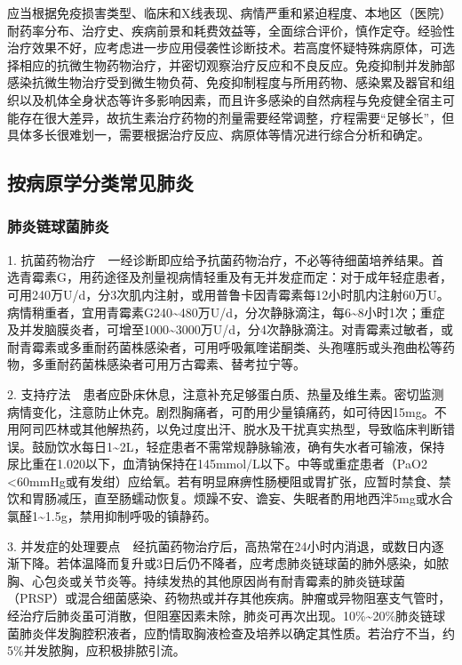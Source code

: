 应当根据免疫损害类型、临床和X线表现、病情严重和紧迫程度、本地区（医院）耐药率分布、治疗史、疾病前景和耗费效益等，全面综合评价，慎作定夺。经验性治疗效果不好，应考虑进一步应用侵袭性诊断技术。若高度怀疑特殊病原体，可选择相应的抗微生物药物治疗，并密切观察治疗反应和不良反应。免疫抑制并发肺部感染抗微生物治疗受到微生物负荷、免疫抑制程度与所用药物、感染累及器官和组织以及机体全身状态等许多影响因素，而且许多感染的自然病程与免疫健全宿主可能存在很大差异，故抗生素治疗药物的剂量需要经常调整，疗程需要“足够长”，但具体多长很难划一，需要根据治疗反应、病原体等情况进行综合分析和确定。

\subsection{按病原学分类常见肺炎}

\subsubsection{肺炎链球菌肺炎}

1.
抗菌药物治疗　一经诊断即应给予抗菌药物治疗，不必等待细菌培养结果。首选青霉素G，用药途径及剂量视病情轻重及有无并发症而定：对于成年轻症患者，可用240万U/d，分3次肌内注射，或用普鲁卡因青霉素每12小时肌内注射60万U。病情稍重者，宜用青霉素G240\textasciitilde{}480万U/d，分次静脉滴注，每6\textasciitilde{}8小时1次；重症及并发脑膜炎者，可增至1000\textasciitilde{}3000万U/d，分4次静脉滴注。对青霉素过敏者，或耐青霉素或多重耐药菌株感染者，可用呼吸氟喹诺酮类、头孢噻肟或头孢曲松等药物，多重耐药菌株感染者可用万古霉素、替考拉宁等。

2.
支持疗法　患者应卧床休息，注意补充足够蛋白质、热量及维生素。密切监测病情变化，注意防止休克。剧烈胸痛者，可酌用少量镇痛药，如可待因15mg。不用阿司匹林或其他解热药，以免过度出汗、脱水及干扰真实热型，导致临床判断错误。鼓励饮水每日1\textasciitilde{}2L，轻症患者不需常规静脉输液，确有失水者可输液，保持尿比重在1.020以下，血清钠保持在145mmol/L以下。中等或重症患者（PaO{2}
\textless{}60mmHg或有发绀）应给氧。若有明显麻痹性肠梗阻或胃扩张，应暂时禁食、禁饮和胃肠减压，直至肠蠕动恢复。烦躁不安、谵妄、失眠者酌用地西泮5mg或水合氯醛1\textasciitilde{}1.5g，禁用抑制呼吸的镇静药。

3.
并发症的处理要点　经抗菌药物治疗后，高热常在24小时内消退，或数日内逐渐下降。若体温降而复升或3日后仍不降者，应考虑肺炎链球菌的肺外感染，如脓胸、心包炎或关节炎等。持续发热的其他原因尚有耐青霉素的肺炎链球菌（PRSP）或混合细菌感染、药物热或并存其他疾病。肿瘤或异物阻塞支气管时，经治疗后肺炎虽可消散，但阻塞因素未除，肺炎可再次出现。10\%\textasciitilde{}20\%肺炎链球菌肺炎伴发胸腔积液者，应酌情取胸液检查及培养以确定其性质。若治疗不当，约5\%并发脓胸，应积极排脓引流。

